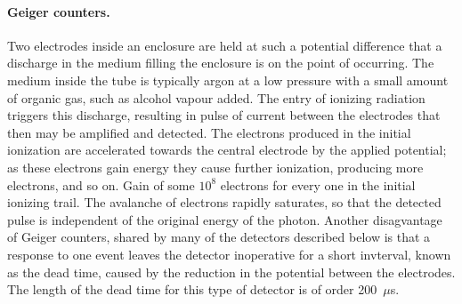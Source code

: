\documentclass{article}
\begin{document}
\paragraph{Geiger counters.} Two electrodes inside an enclosure are held at such a 
potential difference that a discharge in the medium filling the enclosure
is on the point of occurring. The medium inside the tube is typically argon at a 
low pressure with a small amount of organic gas, such as alcohol vapour added.
The entry of ionizing radiation triggers this discharge,
resulting in pulse of current between the electrodes that then may be amplified and
detected. The electrons produced in the initial ionization are accelerated towards
the central electrode by the applied potential; as these electrons gain energy they
cause further ionization, producing more electrons, and so on. Gain of some $10^8$ electrons for every one in the initial ionizing trail. The avalanche of electrons rapidly 
saturates, so that the detected pulse is independent of the original energy of the
photon. Another disagvantage of Geiger counters, shared by many of the
detectors described below is that a response to one event leaves the
detector inoperative for a short invterval, known as the dead
time, caused by the reduction in the potential between the
electrodes. The length of the dead time for this type of detector is of
order 200~$\mu$s.
\end{document}
